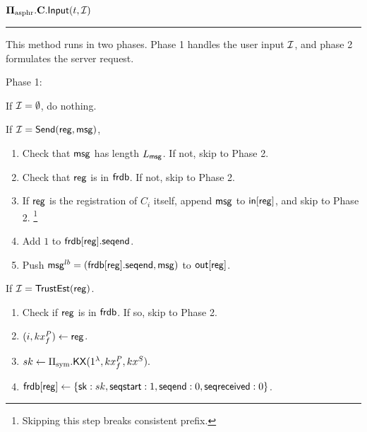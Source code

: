 \begin{definition}
\vspace{10pt}
$\mathbf{\Pi_{\text{asphr}}.C.\mathsf{Input}}(t, \mathcal{I})$
\vspace{5pt}
\hrule
\vspace{5pt}
This method runs in two phases. Phase 1 handles the user input $\mathcal{I}$, and phase 2 formulates the server request.

Phase 1: 

If $\mathcal{I} = \emptyset$, do nothing. 

If $\mathcal{I} = \mathsf{Send}(\mathsf{reg}, \mathsf{msg})$, 

\begin{enumerate}
    \item Check that $\mathsf{msg}$ has length $L_{\mathsf{msg}}$. If not, skip to Phase 2.
    \item Check that $\mathsf{reg}$ is in $\mathsf{frdb}$. If not, skip to Phase 2.
    \item If $\mathsf{reg}$ is the registration of $C_i$ itself, append $\mathsf{msg}$ to $\mathsf{in}[\mathsf{reg}]$, and skip to Phase 2. \footnote{Skipping this step breaks consistent prefix.}
    \item Add $1$ to $\mathsf{frdb}[\mathsf{reg}].\mathsf{seqend}$. 
    \item Push $\mathsf{msg}^{lb} = (\mathsf{frdb}[\mathsf{reg}].\mathsf{seqend}, \mathsf{msg})$ to $\mathsf{out}[\mathsf{reg}]$.
\end{enumerate}

If $\mathcal{I} = \mathsf{TrustEst}(\mathsf{reg})$.
\begin{enumerate}
    \item Check if $\mathsf{reg}$ is in $\mathsf{frdb}$. If so, skip to Phase 2.
    \item $(i, kx_f^P) \leftarrow \mathsf{reg}$.
    \item $sk \leftarrow \Pi_{\text{sym}}.\mathsf{KX}(1^{\lambda}, kx_f^P, kx^S).$
    \item $\mathsf{frdb}[\mathsf{reg}] \leftarrow \{{\mathsf{sk}}: sk,  \mathsf{seqstart}: 1, \mathsf{seqend}: 0, \mathsf{seqreceived}: 0\}$.
\end{enumerate}


\end{definition}
